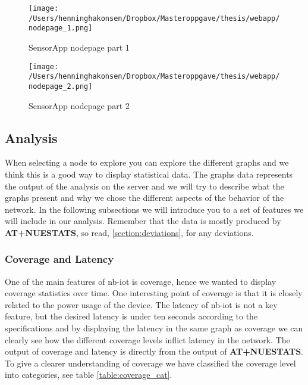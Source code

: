 \documentclass[USenglish]{ifimaster}  %
\begin{document}
\begin{figure}[H]
  \centering
  \texttt{[image: /Users/henninghakonsen/Dropbox/Masteroppgave/thesis/webapp/nodepage\_1.png]}
  \caption{SensorApp nodepage part 1}
  \label{pic:nodepage1}
\end{figure}

\begin{figure}[H]
  \centering
  \texttt{[image: /Users/henninghakonsen/Dropbox/Masteroppgave/thesis/webapp/nodepage\_2.png]}
  \caption{SensorApp nodepage part 2}
  \label{pic:nodepage2}
\end{figure}

\subsection{Analysis} \label{ssection:analysis}
When selecting a node to explore you can explore the different graphs and we think this is a good way to display statistical data. The graphs data represents the output of the analysis on the server and we will try to describe what the graphs present and why we chose the different aspects of the behavior of the network.
In the following subsections we will introduce you to a set of features we will include in our analysis. Remember that the data is mostly produced by \textbf{AT+NUESTATS}, so read, \vref{section:deviations}, for any deviations.

\subsubsection{Coverage and Latency}
One of the main features of \acrshort{nb-iot} is coverage, hence we wanted to display coverage statistics over time. One interesting point of coverage is that it is closely related to the power usage of the device. The latency of \acrshort{nb-iot} is not a key feature, but the desired latency is under ten seconds according to the specifications\cite{datasheet:ubloxchip} and by displaying the latency in the same graph as coverage we can clearly see how the different coverage levels inflict latency in the network. The output of coverage and latency is directly from the output of \textbf{AT+NUESTATS}. To give a clearer understanding of coverage we have classified the coverage level into categories, see table \vref{table:coverage_cat}.

\begin{table}[H]
\centering
{}
\caption{Coverage categories}
\label{table:coverage_cat}
\end{table}
\end{document}
